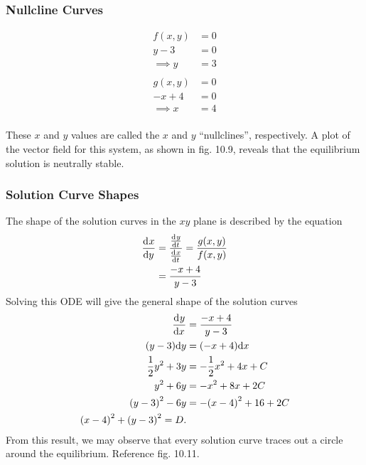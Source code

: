 \documentclass[12pt,twoside]{article}
\begin{document}
\subsubsection*{Nullcline Curves}
\begin{multicols}{2}
  \begin{equation*}
    \begin{aligned}
      f(x,y) &= 0 \\
      y-3 &= 0 \\
      \implies y&=3 \\
    \end{aligned}
  \end{equation*}
  \break
  \begin{equation*}
    \begin{aligned}
      g(x,y) &= 0 \\
      -x+4 &= 0 \\
      \implies x&=4 \\
    \end{aligned}
  \end{equation*}
\end{multicols}
These $x$ and $y$ values are called the $x$ and $y$ ``nullclines'',
respectively. A plot of the vector field for this system, as shown in fig. 10.9,
reveals that the equilibrium solution is neutrally stable.

\subsubsection*{Solution Curve Shapes}
The shape of the solution curves in the $xy$ plane is described by the equation
\begin{equation*}
  \begin{aligned}
    \frac{\mathrm{d}^{} {x}}{\mathrm{d}{y}^{}} &= \frac{\frac{\mathrm{d}^{} {y}}{\mathrm{d}{t}^{}}}{\frac{\mathrm{d}^{} {x}}{\mathrm{d}{t}^{}}} = \frac{g(x,y)}{f(x,y)} \\
    &= \frac{-x+4}{y-3} \\
  \end{aligned}
\end{equation*}
Solving this ODE will give the general shape of the solution curves
\begin{equation*}
  \begin{aligned}
    \frac{\mathrm{d}^{} {y}}{\mathrm{d}{x}^{}} &= \frac{-x+4}{y-3} \\
    (y-3)\mathrm{d}{y} &= (-x+4)\mathrm{d}{x} \\
    \frac{1}{2}y^2+3y &= -\frac{1}{2}x^2+4x + C \\
    y^2 + 6y &= -x^2 + 8x + 2C \\
    {(y-3)}^2 - 6y &= -{(x-4)}^2 + 16 + 2C \\
    {(x-4)}^2 + {(y-3)}^2 = D. \\
  \end{aligned}
\end{equation*}
From this result, we may observe that every solution curve traces out a circle
around the equilibrium. Reference fig. 10.11.
\end{document}
